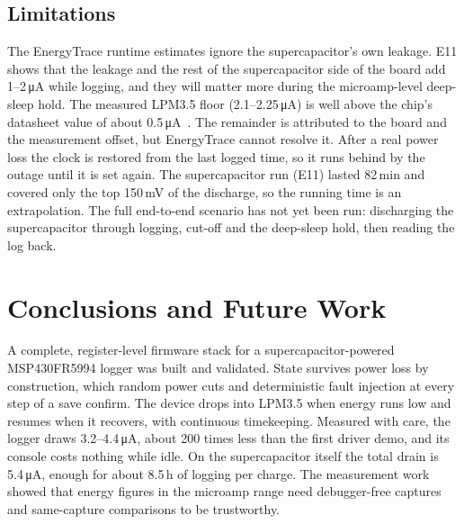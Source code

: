 \documentclass[conference]{IEEEtran}
\newcommand{\uA}{\,\si{\micro\ampere}}
\begin{document}
\subsection{Limitations}

The EnergyTrace runtime estimates ignore the supercapacitor's own leakage. E11 shows that the leakage and the rest of the supercapacitor side of the board add 1--2\uA{} while logging, and they will matter more during the microamp-level deep-sleep hold. The measured LPM3.5 floor (2.1--2.25\uA) is well above the chip's datasheet value of about 0.5\uA~\cite{ti_slase54}. The remainder is attributed to the board and the measurement offset, but EnergyTrace cannot resolve it. After a real power loss the clock is restored from the last logged time, so it runs behind by the outage until it is set again. The supercapacitor run (E11) lasted 82\,min and covered only the top 150\,mV of the discharge, so the running time is an extrapolation. The full end-to-end scenario has not yet been run: discharging the supercapacitor through logging, cut-off and the deep-sleep hold, then reading the log back.

\section{Conclusions and Future Work}
\label{sec:conclusion}

A complete, register-level firmware stack for a supercapacitor-powered MSP430FR5994 logger was built and validated. State survives power loss by construction, which random power cuts and deterministic fault injection at every step of a save confirm. The device drops into LPM3.5 when energy runs low and resumes when it recovers, with continuous timekeeping. Measured with care, the logger draws 3.2--4.4\uA, about 200 times less than the first driver demo, and its console costs nothing while idle. On the supercapacitor itself the total drain is 5.4\uA, enough for about 8.5\,h of logging per charge. The measurement work showed that energy figures in the microamp range need debugger-free captures and same-capture comparisons to be trustworthy.
\end{document}
